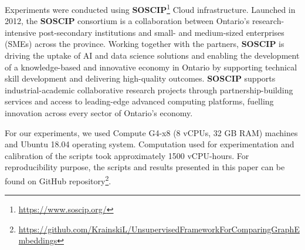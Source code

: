 \documentclass[11pt]{article}
\begin{document}
Experiments were conducted using \textbf{SOSCIP}\footnote{\url{https://www.soscip.org/}} Cloud infrastructure.  Launched in 2012, the \textbf{SOSCIP} consortium is a collaboration between Ontario’s research-intensive post-secondary institutions and small- and medium-sized enterprises (SMEs) across the province. Working together with the partners, \textbf{SOSCIP} is driving the uptake of AI and data science solutions and enabling the development of a knowledge-based and innovative economy in Ontario by supporting technical skill development and delivering high-quality outcomes. \textbf{SOSCIP} supports industrial-academic collaborative research projects through partnership-building services and access to leading-edge advanced computing platforms, fuelling innovation across every sector of Ontario’s economy.

For our experiments, we used Compute G4-x8 (8 vCPUs,	32 GB RAM) machines and Ubuntu 18.04 operating system. Computation used for experimentation and calibration of the scripts took approximately 1500 vCPU-hours. For reproducibility purpose, the scripts and results presented in this paper can be found on GitHub repository\footnote{\url{https://github.com/KrainskiL/UnsupervisedFrameworkForComparingGraphEmbeddings}}.
\end{document}
